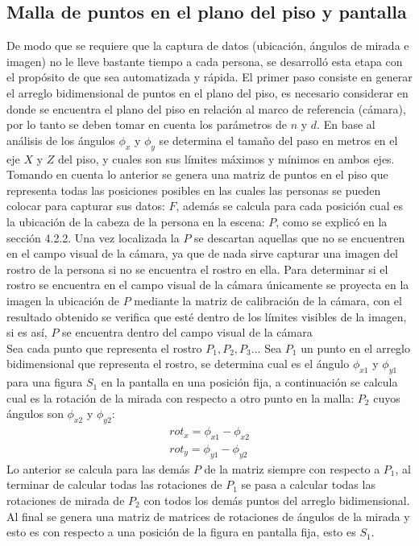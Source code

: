 	 \subsection{Malla de puntos en el plano del piso y pantalla}
	 De modo que se requiere que la captura de datos (ubicación, ángulos de mirada e imagen) no le lleve bastante tiempo a cada persona, se desarrolló esta etapa con el propósito de que sea automatizada y rápida.
	 El primer paso consiste en generar el arreglo bidimensional de puntos en el plano del piso, es necesario considerar en donde se encuentra el plano del piso en relación al marco de referencia (cámara), por lo tanto se deben tomar en cuenta los parámetros de $n$ y $d$. En base al análisis de los ángulos $\phi_x$ y $\phi_y$ se determina el tamaño del paso en metros en el eje $X$ y $Z$ del piso, y cuales son sus límites máximos y mínimos en ambos ejes. \\
	 Tomando en cuenta lo anterior se genera una matriz de puntos en el piso que representa todas las posiciones posibles en las cuales las personas se pueden colocar para capturar sus datos: $F$, además se calcula para cada posición cual es la ubicación de la cabeza de la persona en la escena: $P$, como se explicó en la sección 4.2.2. Una vez localizada la $P$ se descartan aquellas que no se encuentren en el campo visual de la cámara, ya que de nada sirve capturar una imagen del rostro de la persona si no se encuentra el rostro en ella. Para determinar si el rostro se encuentra en el campo visual de la cámara únicamente se proyecta en la imagen la ubicación de $P$ mediante la matriz de calibración de la cámara, con el resultado obtenido se verifica que esté dentro de los límites visibles de la imagen, si es así, $P$ se encuentra dentro del campo visual de la cámara \\
	 Sea cada punto que representa el rostro $P_1, P_2, P_3...$
	 Sea $P_1$ un punto en el arreglo bidimensional que representa el rostro, se determina cual es el ángulo $\phi_{x1}$ y $\phi_{y1}$ para una figura $S_1$ en la pantalla en una posición fija, a continuación se calcula cual es la rotación de la mirada con respecto a otro punto en la malla: $P_2$ cuyos ángulos son $\phi_{x2}$ y $\phi_{y2}$:
	         \begin{eqnarray}
	         rot_x=\phi_{x1}-\phi_{x2}\\
	         rot_y=\phi_{y1}-\phi_{y2}
	         \end{eqnarray}
	 Lo anterior se calcula para las demás $P$ de la matriz siempre con respecto a $P_1$, al terminar de calcular todas las rotaciones de $P_1$ se pasa a calcular todas las rotaciones de mirada de $P_2$ con todos los demás puntos del arreglo bidimensional. Al final se genera una matriz de matrices de rotaciones de ángulos de la mirada y esto es con respecto a una posición de la figura en pantalla fija, esto es $S_1$.\\
